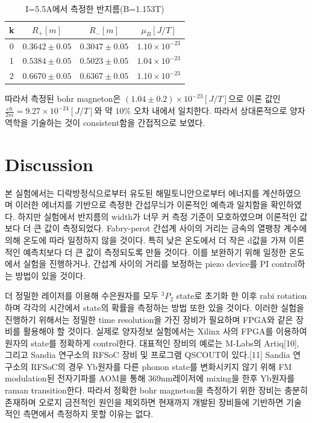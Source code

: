 \documentclass[%
 reprint,
 amsmath,amssymb,
 aps,
]{revtex4-2}
\begin{document}
\begin{table}[]
\begin{tabular}{c|c|c|c} \hline \hline
k & $R_{+}[m]$ & $R_{-}[m]$ & $\mu_{B}[J/T]$ \\ \hline
0&	$0.3642\pm0.05$&	$0.3047\pm0.05$&	$1.10\times10^{-23}$\\
1&	$0.5384\pm0.05$&	$0.5023\pm0.05$&	$1.04\times10^{-23}$\\
2&	$0.6670\pm0.05$&	$0.6367\pm0.05$&	$1.10\times10^{-23}$\\ \hline \hline 
\end{tabular}
\caption{\label{tab:bohr3}I=5.5A에서 측정한 반지름(B=1.153T)}
\end{table}

따라서 측정된 bohr magneton은 $(1.04\pm 0.2 )\times10^{-23}[J/T]$으로 이론 값인 $\frac{e\hbar}{2m}=9.27\times 10^{-24}[J/T]$와 약 $10\%$ 오차 내에서 일치한다. 따라서 상대론적으로 양자역학을 기술하는 것이 consistent함을 간접적으로 보였다.

\section{\label{sec:level1}Discussion}
본 실험에서는 디락방정식으로부터 유도된 해밀토니안으로부터 에너지를 계산하였으며 이러한 에너지를 기반으로 측정한 간섭무늬가 이론적인 예측과 일치함을 확인하였다. 하지만 실험에서 반지름의 width가 너무 커 측정 기준이 모호하였으며 이론적인 값보다 더 큰 값이 측정되었다. Fabry-perot 간섭계 사이의 거리는 금속의 열팽창 계수에 의해 온도에 따라 일정하지 않을 것이다. 특히 낮은 온도에서 더 작은 d값을 가져 이론적인 예측치보다 더 큰 값이 측정되도록 만들 것이다. 이를 보완하기 위해 일정한 온도에서 실험을 진행하거나, 간섭계 사이의 거리를 보정하는 piezo device를 PI control하는 방법이 있을 것이다.

더 정밀한 레이저를 이용해 수은원자를 모두 $^{3}P_{2}$ state로 초기화 한 이후  rabi rotation하며 각각의 시간에서 state의 확률을 측정하는 방법 또한 있을 것이다. 이러한 실험을 진행하기 위해서는 정밀한 time resolution을 가진 장비가 필요하며 FPGA와 같은 장비를 활용해야 할 것이다. 실제로 양자정보 실험에서는 Xilinx 사의 FPGA를 이용하여 원자의 state를 정확하게 control한다. 대표적인 장비의 예로는 M-Labs의 Artiq[10], 그리고 Sandia 연구소의 RFSoC 장비 및 프로그램 QSCOUT이 있다.[11] Sandia 연구소의 RFSoC의 경우 Yb원자를 다른 phonon state를 변화시키지 않기 위해 FM modulation된 전자기파를 AOM을 통해 369nm레이저에 mixing을 한후 Yb원자를 raman transition한다. 따라서 정확한 bohr magneton을 측정하기 위한 장비는 충분히 존재하며 오로지 금전적인 원인을 제외하면 현재까지 개발된 장비들에 기반하면 기술적인 측면에서 측정하지 못할 이유는 없다.
\end{document}
